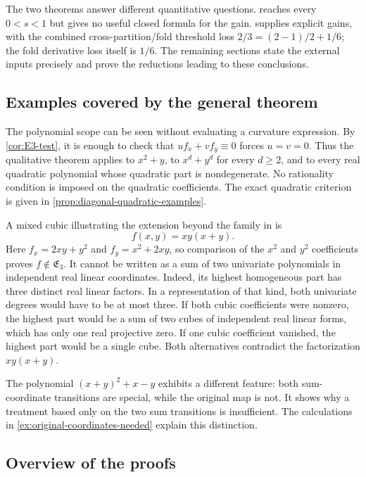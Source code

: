 \documentclass[11pt]{article}
\begin{document}
The two theorems answer different quantitative questions.
 reaches every \(0<s<1\) but gives no useful
closed formula for the gain.   supplies explicit
gains, with the combined cross-partition/fold threshold loss
\(2/3=(2-1)/2+1/6\); the fold derivative loss itself is \(1/6\).
The remaining sections state the external inputs precisely and prove
the reductions leading to these conclusions.

\subsection{Examples covered by the general theorem}

The polynomial scope can be seen without evaluating a curvature
expression.  By \cref{cor:E3-test}, it is enough to check that
\(uf_x+vf_y\equiv0\) forces \(u=v=0\).  Thus the qualitative
theorem applies to \(x^2+y\), to \(x^d+y^d\) for every \(d\ge2\),
and to every real quadratic polynomial whose quadratic part is
nondegenerate.  No rationality condition is imposed on the quadratic
coefficients.  The exact quadratic criterion is given in
\cref{prop:diagonal-quadratic-examples}.

A mixed cubic illustrating the extension beyond the family in
\cite{IPQSX} is
\[
 f(x,y)=xy(x+y).
\]
Here \(f_x=2xy+y^2\) and \(f_y=x^2+2xy\), so comparison of the
\(x^2\) and \(y^2\) coefficients proves \(f\notin\mathfrak E_3\).
It cannot be written as a sum of two univariate polynomials in
independent real linear coordinates.  Indeed, its highest homogeneous
part has three distinct real linear factors.  In a representation
of that kind, both univariate degrees would have to be at most three.
If both cubic coefficients were nonzero, the highest part would be
a sum of two cubes of independent real linear forms, which has only
one real projective zero.  If one cubic coefficient vanished, the
highest part would be a single cube.  Both alternatives contradict
the factorization \(xy(x+y)\).

The polynomial \((x+y)^2+x-y\) exhibits a different feature: both
sum-coordinate transitions are special, while the original map is
not.  It shows why a treatment based only on the two sum transitions
is insufficient.  The calculations in
\cref{ex:original-coordinates-needed} explain this distinction.

\subsection{Overview of the proofs}
\end{document}
